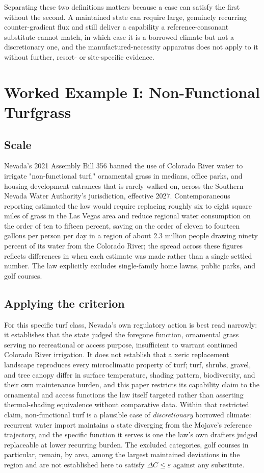 \documentclass[11pt]{article}
\begin{document}
Separating these two definitions matters because a case can satisfy the first without the second. A maintained state can require large, genuinely recurring counter-gradient flux and still deliver a capability a reference-consonant substitute cannot match, in which case it is a borrowed climate but not a discretionary one, and the manufactured-necessity apparatus does not apply to it without further, resort- or site-specific evidence.

\section{Worked Example I: Non-Functional Turfgrass}

\subsection{Scale}

Nevada's 2021 Assembly Bill 356 banned the use of Colorado River water to irrigate "non-functional turf," ornamental grass in medians, office parks, and housing-development entrances that is rarely walked on, across the Southern Nevada Water Authority's jurisdiction, effective 2027. Contemporaneous reporting estimated the law would require replacing roughly six to eight square miles of grass in the Las Vegas area and reduce regional water consumption on the order of ten to fifteen percent, saving on the order of eleven to fourteen gallons per person per day in a region of about 2.3 million people drawing ninety percent of its water from the Colorado River; the spread across these figures reflects differences in when each estimate was made rather than a single settled number. The law explicitly excludes single-family home lawns, public parks, and golf courses.

\subsection{Applying the criterion}

For this specific turf class, Nevada's own regulatory action is best read narrowly: it establishes that the state judged the foregone function, ornamental grass serving no recreational or access purpose, insufficient to warrant continued Colorado River irrigation. It does not establish that a xeric replacement landscape reproduces every microclimatic property of turf; turf, shrubs, gravel, and tree canopy differ in surface temperature, shading pattern, biodiversity, and their own maintenance burden, and this paper restricts its capability claim to the ornamental and access functions the law itself targeted rather than asserting thermal-shading equivalence without comparative data. Within that restricted claim, non-functional turf is a plausible case of \emph{discretionary} borrowed climate: recurrent water import maintains a state diverging from the Mojave's reference trajectory, and the specific function it serves is one the law's own drafters judged replaceable at lower recurring burden. The excluded categories, golf courses in particular, remain, by area, among the largest maintained deviations in the region and are not established here to satisfy $\Delta C \leq \varepsilon$ against any substitute.
\end{document}

